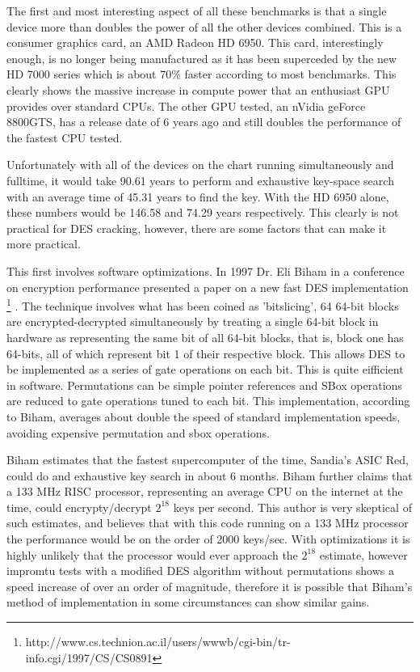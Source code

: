 \documentclass[12pt]{article}
\begin{document}
The first and most interesting aspect of all these benchmarks is that a single 
device more than doubles the power of all the other devices combined. This is
a consumer graphics card, an AMD Radeon HD 6950. This card, interestingly enough,
is no longer being manufactured as it has been superceded by the new HD 7000 series
which is about 70\% faster according to most benchmarks. This clearly shows the
massive increase in compute power that an enthusiast GPU provides over standard
CPUs. The other GPU tested, an nVidia geForce 8800GTS, has a release date of 6 years
ago and still doubles the performance of the fastest CPU tested.

Unfortunately with all of the devices on the chart running simultaneously and fulltime,
it would take 90.61 years to perform and exhaustive key-space search with an average time
of 45.31 years to find the key. With the HD 6950 alone, these numbers would be 146.58
and 74.29 years respectively. This clearly is not practical for DES cracking, 
however, there are some factors that can make it more practical.

This first involves software optimizations. In 1997 Dr. Eli Biham in a conference
on encryption performance presented a paper on a new fast DES implementation
\footnote{http://www.cs.technion.ac.il/users/wwwb/cgi-bin/tr-info.cgi/1997/CS/CS0891}
. The technique involves what has been coined as 'bitslicing', 64 64-bit blocks
are encrypted-decrypted simultaneously by treating a single 64-bit block in hardware
as representing the same bit of all 64-bit blocks, that is, block one has 64-bits,
all of which represent bit 1 of their respective block. This allows DES to be
implemented as a series of gate operations on each bit. This is quite eifficient
in software. Permutations can be simple pointer references and SBox operations
are reduced to gate operations tuned to each bit. This implementation, according to Biham,
averages about double the speed of standard implementation speeds, avoiding expensive
permutation and sbox operations.

Biham estimates that the fastest supercomputer of the time, Sandia's ASIC Red,
could do and exhaustive key search in about 6 months. Biham further claims that
a 133 MHz RISC processor, representing an average CPU on the internet at the time,
could encrypty/decrypt $2^{18}$ keys per second. This author is very skeptical of
such estimates, and believes that with this code running on a 133 MHz processor
the performance would be on the order of 2000 keys/sec. With optimizations it is 
highly unlikely that the processor would ever approach the $2^{18}$ estimate, however
impromtu tests with a modified DES algorithm without permutations shows a speed 
increase of over an order of magnitude, therefore it is possible that Biham's 
method of implementation in some circumstances can show similar gains.
\end{document}
